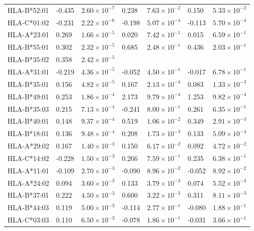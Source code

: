 \documentclass[]{article}
\begin{document}
\begin{doublespace}
\begin{longtable}[H]{p{3cm}p{1cm}p{2cm}p{1cm}p{2cm}p{1cm}p{2cm}}
		HLA-B*52:01 & -0.435 & $2.60 \times 10^{-7}$ & 0.238 & $7.63 \times 10^{-2}$ & 0.150 & $5.33 \times 10^{-2}$ \\ 
		HLA-C*01:02 & -0.231 & $2.22 \times 10^{-6}$ & -0.198 & $5.07 \times 10^{-4}$ & -0.113 & $5.70 \times 10^{-4}$ \\ 
		HLA-A*23:01 & 0.269 & $1.66 \times 10^{-5}$ & 0.020 & $7.42 \times 10^{-1}$ & 0.015 & $6.59 \times 10^{-1}$ \\ 
		HLA-B*55:01 & 0.302 & $2.32 \times 10^{-5}$ & 0.685 & $2.48 \times 10^{-1}$ & 0.436 & $2.03 \times 10^{-1}$ \\ 
		HLA-B*35:02 & 0.358 & $2.42 \times 10^{-5}$ &  &  &  &  \\ 
		HLA-A*31:01 & -0.219 & $4.36 \times 10^{-5}$ & -0.052 & $4.50 \times 10^{-1}$ & -0.017 & $6.78 \times 10^{-1}$ \\ 
		HLA-B*35:01 & 0.156 & $4.82 \times 10^{-5}$ & 0.167 & $2.13 \times 10^{-4}$ & 0.083 & $1.33 \times 10^{-3}$ \\ 
		HLA-B*49:01 & 0.253 & $1.86 \times 10^{-4}$ & 2.173 & $9.79 \times 10^{-4}$ & 1.253 & $9.82 \times 10^{-4}$ \\ 
		HLA-B*35:03 & 0.215 & $7.13 \times 10^{-4}$ & -0.241 & $8.00 \times 10^{-1}$ & 0.261 & $6.35 \times 10^{-1}$ \\ 
		HLA-B*40:01 & 0.148 & $9.37 \times 10^{-4}$ & 0.519 & $1.06 \times 10^{-2}$ & 0.349 & $2.91 \times 10^{-3}$ \\ 
		HLA-B*18:01 & 0.136 & $9.48 \times 10^{-4}$ & 0.208 & $1.73 \times 10^{-3}$ & 0.133 & $5.09 \times 10^{-4}$ \\ 
		HLA-A*29:02 & 0.167 & $1.40 \times 10^{-3}$ & 0.150 & $6.17 \times 10^{-2}$ & 0.092 & $4.72 \times 10^{-2}$ \\ 
		HLA-C*14:02 & -0.228 & $1.50 \times 10^{-3}$ & 0.266 & $7.59 \times 10^{-1}$ & 0.235 & $6.38 \times 10^{-1}$ \\ 
		HLA-A*11:01 & -0.109 & $2.70 \times 10^{-3}$ & -0.090 & $8.96 \times 10^{-2}$ & -0.052 & $8.92 \times 10^{-2}$ \\ 
		HLA-A*24:02 & 0.094 & $3.60 \times 10^{-3}$ & 0.133 & $3.79 \times 10^{-3}$ & 0.074 & $5.52 \times 10^{-3}$ \\ 
		HLA-B*37:01 & 0.222 & $4.50 \times 10^{-3}$ & 0.600 & $3.22 \times 10^{-3}$ & 0.311 & $8.11 \times 10^{-3}$ \\ 
		HLA-B*44:03 & 0.119 & $5.00 \times 10^{-3}$ & -0.114 & $2.77 \times 10^{-1}$ & -0.080 & $1.88 \times 10^{-1}$ \\ 
		HLA-C*03:03 & 0.110 & $6.50 \times 10^{-3}$ & -0.078 & $1.86 \times 10^{-1}$ & -0.031 & $3.66 \times 10^{-1}$ \\ 

\end{longtable}
\end{doublespace}
\end{document}
